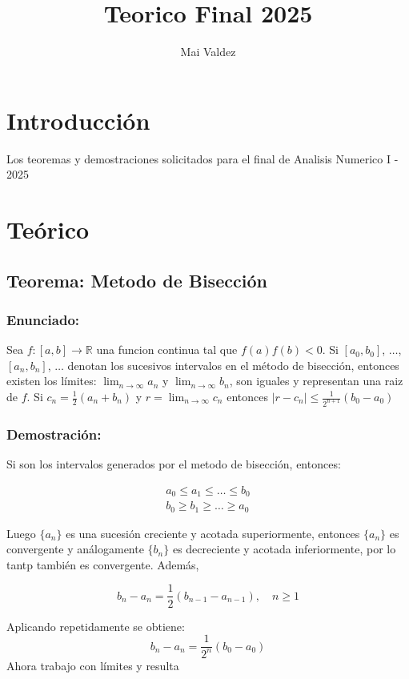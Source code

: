 \documentclass[a4paper,12pt]{article}
\title{Teorico Final 2025}
\author{Mai Valdez}
\begin{document}
\maketitle

\section{Introducción}
Los teoremas y demostraciones solicitados para el final de Analisis Numerico I - 2025

\section{Teórico}
\subsection{Teorema: Metodo de Bisección}
\subsubsection{Enunciado:}
Sea $f: [a,b] \to \mathbb{R}$ una funcion continua tal que $f(a)f(b)<0$. Si $[a_0,b_0]$, $\dots$, $[a_n,b_n]$, $\dots$ denotan los sucesivos intervalos en el método de bisección, 
entonces existen los límites: $\lim_{n \to \infty} a_n$ y $\lim_{n \to \infty} b_n$, son iguales y representan una raiz de $f$. 
Si $c_n=\frac{1}{2}(a_n+b_n)$ y $r= \lim_{n \to \infty} c_n$ entonces $\lvert r-c_n \rvert \leq \frac{1}{2^{n+1}}(b_0-a_0)$

\subsubsection{Demostración:}
Si son los intervalos generados por el metodo de bisección, entonces:

\begin{gather*}
a_0\leq a_1\leq \dots \leq b_0 \\
b_0\geq b_1\geq \dots \geq a_0
\end{gather*}

Luego $\{a_n\}$ es una sucesión creciente y acotada superiormente, entonces $\{a_n\}$ es convergente y análogamente $\{b_n\}$ es decreciente y acotada inferiormente, por lo tantp también es convergente. Además,

\[
    b_n-a_n= \frac{1}{2}(b_{n-1}-a_{n-1}), \quad n\geq 1
\]

Aplicando repetidamente se obtiene:
\[ 
 b_n-a_n= \frac{1}{2^n}(b_0-a_0)
\]
Ahora trabajo con límites y resulta
\end{document}
